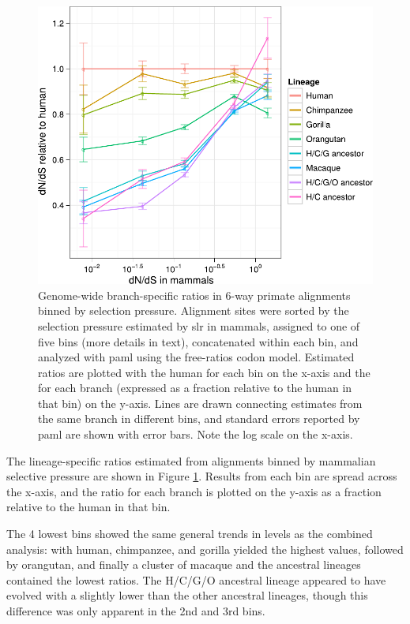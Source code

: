 \begin{figure}
\centering
\includegraphics[scale=0.9]{Figs/gorilla_dnds2.pdf}
\caption{Genome-wide branch-specific \dnds ratios in 6-way primate
  alignments binned by \sw selection pressure. Alignment sites were
  sorted by the \sw selection pressure estimated by \ac{slr} in
  mammals, assigned to one of five bins (more details in text),
  concatenated within each bin, and analyzed with \ac{paml} using the
  free-ratios codon model. Estimated \dnds ratios are plotted with the
  human \dnds for each bin on the x-axis and the \dnds for each branch
  (expressed as a fraction relative to the human \dnds in that bin) on
  the y-axis. Lines are drawn connecting estimates from the same
  branch in different bins, and standard errors reported by \ac{paml}
  are shown with error bars. Note the log scale on the x-axis.}
\label{fig_gorilla_dnds2}
\end{figure}

The lineage-specific \dnds ratios estimated from alignments binned by
\sw mammalian selective pressure are shown in Figure
\ref{fig_gorilla_dnds2}. Results from each bin are spread across the
x-axis, and the \dnds ratio for each branch is plotted on the y-axis
as a fraction relative to the human \dnds in that bin.

The 4 lowest \dnds bins showed the same general trends in \dnds levels
as the combined analysis: with human, chimpanzee, and gorilla yielded
the highest \dnds values, followed by orangutan, and finally a cluster
of macaque and the ancestral lineages contained the lowest \dnds
ratios. The H/C/G/O ancestral lineage appeared to have evolved with a
slightly lower \dnds than the other ancestral lineages, though this
difference was only apparent in the 2nd and 3rd bins.

